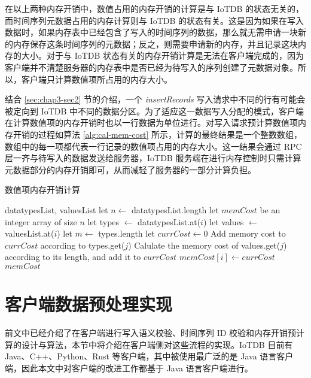 在以上两种内存开销中，数值占用的内存开销的计算是与 IoTDB 的状态无关的，而时间序列元数据占用的内存计算则与 IoTDB 的状态有关。这是因为如果在写入数据时，如果内存表中已经包含了写入的时间序列的数据，那么就无需申请一块新的内存保存这条时间序列的元数据；反之，则需要申请新的内存，并且记录这块内存的大小。对于与 IoTDB 状态有关的内存开销计算是无法在客户端完成的，因为客户端并不清楚服务器的内存表中是否已经为待写入的序列创建了元数据对象。所以，客户端只计算数值项所占用的内存大小。

结合 \ref{sec:chap3-sec2} 节的介绍，一个 \emph{insertRecords} 写入请求中不同的行有可能会被定向到 IoTDB 中不同的数据分区。为了适应这一数据写入分配的模式，客户端在计算数值项的内存开销时也以一行数据为单位进行。对写入请求预计算数值项内存开销的过程如算法 \ref{alg:cal-mem-cost} 所示，计算的最终结果是一个整数数组，数组中的每一项都代表一行记录的数值项占用的内存大小。这一结果会通过 RPC 层一齐与待写入的数据发送给服务器，IoTDB 服务端在进行内存控制时只需计算元数据部分的内存开销即可，从而减轻了服务器的一部分计算负担。

\begin{algorithm}
  \caption{数值项内存开销计算}
  \label{alg:cal-mem-cost}
  \small
  \begin{algorithmic}
    \REQUIRE datatypesList, valuesList
    \STATE let $n \leftarrow$ datatypesList.length
    \STATE let $memCost$ be an integer array of size $n$
      \STATE let types $\leftarrow$ datatypesList.at($i$)
      \STATE let values $\leftarrow$ valuesList.at($i$)
      \STATE let $m \leftarrow$ types.length
      \STATE let $currCost \leftarrow 0$
        \STATE Add memory cost to $currCost$ according to types.get($j$)
          \STATE Calulate the memory cost of values.get($j$) according to its length, and add it to $currCost$
        \ENDIF
      \ENDFOR
      \STATE $memCost[i] \leftarrow currCost$
    \ENDFOR
    \RETURN $memCost$
  \end{algorithmic}
\end{algorithm}

\section{客户端数据预处理实现}
前文中已经介绍了在客户端进行写入语义校验、时间序列 ID 校验和内存开销预计算的设计与算法，本节中将介绍在客户端侧对这些流程的实现。IoTDB 目前有 Java、C++、Python、Rust 等客户端，其中被使用最广泛的是 Java 语言客户端，因此本文中对客户端的改进工作都基于 Java 语言客户端进行。

